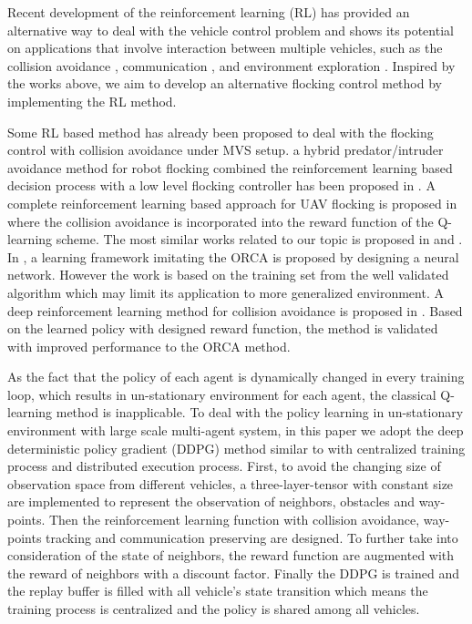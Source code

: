 \documentclass[letterpaper,10 pt,conference]{ieeeconf}
\begin{document}
Recent development of the reinforcement learning (RL) \cite{Sutton2005Reinforcement} has provided an alternative way to deal with the vehicle control problem and shows its potential on applications that involve interaction between multiple vehicles, such as the collision avoidance \cite{chen2017decentralized}, communication \cite{foerster2016learning}, and environment exploration \cite{pham2018cooperative}. Inspired by the works above, we aim to develop an alternative flocking control method by implementing the RL method. 

Some RL based method has already been proposed to deal with the flocking control with collision avoidance under MVS setup. a
hybrid predator/intruder avoidance method for robot flocking combined the reinforcement learning based decision process
with a low level flocking controller has been proposed in \cite{La2015Multirobot}. A complete reinforcement learning based approach for UAV flocking is proposed in \cite{Hung2016A} where the collision avoidance is incorporated into the reward function of the Q-learning scheme. The most similar works related to our topic is proposed in \cite{Long2016Deep} and \cite{chen2017decentralized}.  In \cite{Long2016Deep}, a learning framework imitating the ORCA \cite{Berg2008Reciprocal} is proposed by designing a neural network. However the work is based on the training set from the well validated algorithm which may limit its application to more generalized environment. A deep reinforcement learning method for collision avoidance is proposed in \cite{chen2017decentralized}. Based on the learned policy with designed reward function, the method is validated with improved performance to the ORCA method. 

As the fact that the policy of each agent is dynamically changed in every training loop, which results in un-stationary environment for each agent, the classical Q-learning method is inapplicable. To deal with the policy learning in un-stationary environment with large scale multi-agent system, in this paper we adopt the deep deterministic policy gradient (DDPG) method similar to \cite{DBLP:journals/corr/LoweWTHAM17} with centralized training process and distributed execution process. First,  to avoid the changing size of observation space from different vehicles, a three-layer-tensor with constant size are implemented to represent the observation of neighbors, obstacles and way-points. Then the reinforcement learning function with collision avoidance, way-points tracking and communication preserving are designed. To further take into consideration of the state of neighbors, the reward function are augmented with the reward of neighbors  with a discount factor. Finally the DDPG is trained and the replay buffer is filled with all vehicle’s state transition which means the training process is centralized and the policy is shared among all vehicles.
\end{document}
